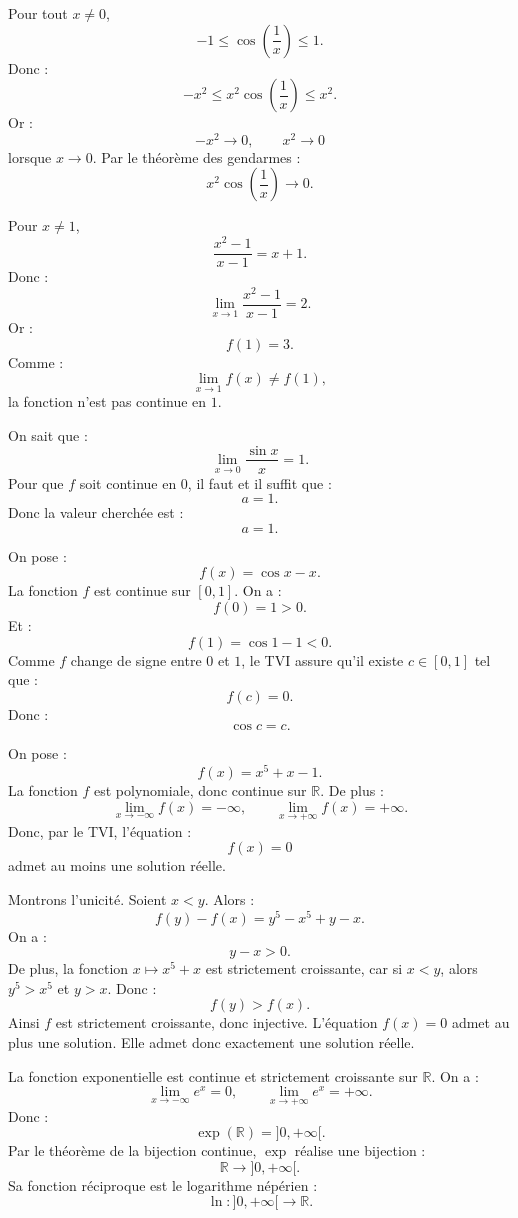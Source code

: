 \documentclass[11pt,a4paper]{article}
\newcommand{\R}{\mathbb R}
\begin{document}
\begin{correctionbox}[6]
Pour tout \(x\neq0\),
\[
-1\leq \cos\left(\frac1x\right)\leq1.
\]
Donc :
\[
-x^2\leq x^2\cos\left(\frac1x\right)\leq x^2.
\]
Or :
\[
-x^2\to0,
\qquad
x^2\to0
\]
lorsque \(x\to0\).  
Par le théorème des gendarmes :
\[
x^2\cos\left(\frac1x\right)\to0.
\]
\end{correctionbox}

\begin{correctionbox}[7]
Pour \(x\neq1\),
\[
\frac{x^2-1}{x-1}
=
x+1.
\]
Donc :
\[
\lim_{x\to1}\frac{x^2-1}{x-1}=2.
\]
Or :
\[
f(1)=3.
\]
Comme :
\[
\lim_{x\to1}f(x)\neq f(1),
\]
la fonction n'est pas continue en \(1\).
\end{correctionbox}

\begin{correctionbox}[8]
On sait que :
\[
\lim_{x\to0}\frac{\sin x}{x}=1.
\]
Pour que \(f\) soit continue en \(0\), il faut et il suffit que :
\[
a=1.
\]
Donc la valeur cherchée est :
\[
a=1.
\]
\end{correctionbox}

\begin{correctionbox}[9]
On pose :
\[
f(x)=\cos x-x.
\]
La fonction \(f\) est continue sur \([0,1]\).  
On a :
\[
f(0)=1>0.
\]
Et :
\[
f(1)=\cos1-1<0.
\]
Comme \(f\) change de signe entre \(0\) et \(1\), le TVI assure qu'il existe \(c\in[0,1]\) tel que :
\[
f(c)=0.
\]
Donc :
\[
\cos c=c.
\]
\end{correctionbox}

\begin{correctionbox}[10]
On pose :
\[
f(x)=x^5+x-1.
\]
La fonction \(f\) est polynomiale, donc continue sur \(\R\).  
De plus :
\[
\lim_{x\to-\infty}f(x)=-\infty,
\qquad
\lim_{x\to+\infty}f(x)=+\infty.
\]
Donc, par le TVI, l'équation :
\[
f(x)=0
\]
admet au moins une solution réelle.

Montrons l'unicité.  
Soient \(x<y\).  
Alors :
\[
f(y)-f(x)=y^5-x^5+y-x.
\]
On a :
\[
y-x>0.
\]
De plus, la fonction \(x\mapsto x^5+x\) est strictement croissante, car si \(x<y\), alors \(y^5>x^5\) et \(y>x\).  
Donc :
\[
f(y)>f(x).
\]
Ainsi \(f\) est strictement croissante, donc injective.  
L'équation \(f(x)=0\) admet au plus une solution.  
Elle admet donc exactement une solution réelle.
\end{correctionbox}

\begin{correctionbox}[11]
La fonction exponentielle est continue et strictement croissante sur \(\R\).  
On a :
\[
\lim_{x\to-\infty}e^x=0,
\qquad
\lim_{x\to+\infty}e^x=+\infty.
\]
Donc :
\[
\exp(\R)=]0,+\infty[.
\]
Par le théorème de la bijection continue, \(\exp\) réalise une bijection :
\[
\R\to]0,+\infty[.
\]
Sa fonction réciproque est le logarithme népérien :
\[
\ln: ]0,+\infty[\to\R.
\]
\end{correctionbox}
\end{document}
